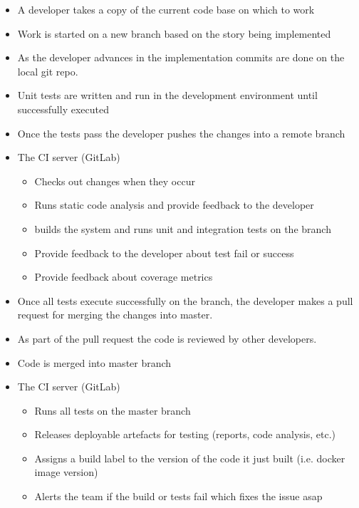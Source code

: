\documentclass[a4paper]{spie}  %
\begin{document}
\begin{itemize}
    \item A developer takes a copy of the current code base on which to work
    \item Work is started on a new branch based on the story being implemented
    \item As the developer advances in the implementation commits are done on the local git repo.
    \item Unit tests are written and run in the development environment until successfully executed
    \item Once the tests pass the developer pushes the changes into a remote branch
    \item The CI server (GitLab)
    \begin{itemize}
        \item Checks out changes when they occur
        \item Runs static code analysis and provide feedback to the developer
        \item builds the system and runs unit and integration tests on the branch
        \item Provide feedback to the developer about test fail or success
        \item Provide feedback about coverage metrics
    \end{itemize}
    \item Once all tests execute successfully on the branch, the developer makes a pull request for merging the changes into master.
    \item As part of the pull request the code is reviewed by other developers.
    \item Code is merged into master branch
    \item The CI server (GitLab)
    \begin{itemize}
        \item Runs all tests on the master branch
        \item Releases deployable artefacts for testing (reports, code analysis, etc.)
        \item Assigns a build label to the version of the code it just built (i.e. docker image version)
        \item Alerts the team if the build or tests fail which fixes the issue asap
    \end{itemize}
\end{itemize}
\end{document}
